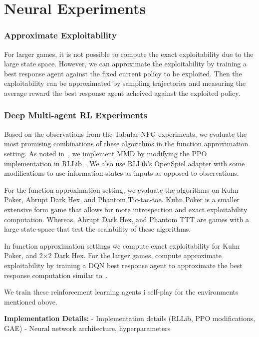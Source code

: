 \chapter{Neural Experiments}

\subsection{Approximate Exploitability}
For larger games, it is not possible to compute the exact exploitability due to the large state space. 
However, we can approximate the exploitability by training a best response agent against the fixed current policy to be exploited. 
Then the exploitability can be approximated by sampling trajectories and measuring the average reward the best response 
agent acheived against the exploited policy.

\subsection{Deep Multi-agent RL Experiments}

Based on the observations from the Tabular NFG experiments, we evaluate the most promising
combinations of these algorithms in the function approximation setting.
As noted in~\cite{sokotaUnified2023}, we implement MMD by modifying the PPO
implementation in RLLib~\cite{liangRLlib2018}.
We also use RLLib's OpenSpiel adapter with some modifications to use information states as inputs
as opposed to observations.

For the function approximation setting, we evaluate the algorithms on Kuhn Poker, Abrupt Dark Hex,
and Phantom Tic-tac-toe.
Kuhn Poker is a smaller extensive form game that allows for more introspection and exact exploitability computation.
Whereas, Abrupt Dark Hex, and Phantom TTT are games with a large state-space that test the scalability of these
algorithms.

In function approximation settings we compute exact exploitability for Kuhn Poker,
and 2$\times$2 Dark Hex.
For the larger games, compute approximate exploitability by training a DQN best response agent to approximate
the best response computation similar to~\cite{sokotaUnified2023}.

We train these reinforcement learning agents i self-play for the environments mentioned above.


\textbf{Implementation Details:} 
- Implementation details (RLLib, PPO modifications, GAE)
- Neural network architecture, hyperparameters

